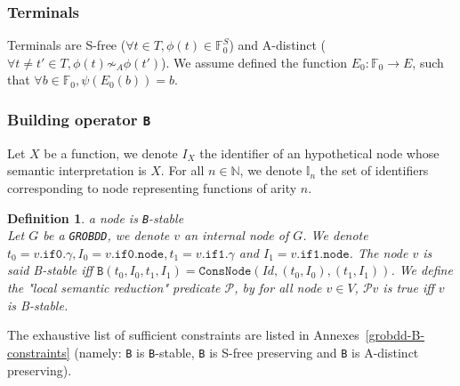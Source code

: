 \documentclass[a4paper,10pt]{article}
\newcommand{\N}{\mathbb{N}}%
\newcommand{\F}{\mathbb{F}}
\newcommand{\I}{\mathbb{I}}
\newcommand{\GroBdd}{\texttt{GROBDD}}
\newcommand{\fieldNode}{\texttt{node}}
\newcommand{\fieldGamma}{\mathtt{\gamma}}
\newcommand{\fieldThen}{\mathtt{if1}}
\newcommand{\fieldElse}{\mathtt{if0}}
\newtheorem{newdef}{Definition}
\newcommand{\definition}[2]{\begin{newdef}{#1\\}#2\end{newdef}}
\begin{document}
\subsubsection{Terminals}
Terminals are S-free ($\forall t\in T, \phi(t)\in\F^S_0$) and A-distinct ($\forall t\neq t'\in T, \phi(t) \not\sim_A \phi(t')$).
We assume defined the function $E_0: \F_0 \longrightarrow E$, such that $\forall b\in\F_0, \psi(E_0(b)) = b$. 


\subsubsection{Building operator \texttt{B}}

Let $X$ be a function, we denote $I_X$ the identifier of an hypothetical node whose semantic interpretation is $X$.
For all $n\in\N$, we denote $\I_n$ the set of identifiers corresponding to node representing functions of arity $n$.

\definition{a node is \texttt{B}-stable}
{
Let $G$ be a \GroBdd{}, we denote $v$ an internal node of $G$.
We denote $t_0 = v.\fieldElse{}.\fieldGamma{}, I_0 = v.\fieldElse{}.\fieldNode{}, t_1 = v.\fieldThen{}.\fieldGamma{}$ and $I_1 = v.\fieldThen{}.\fieldNode{}$.
The node $v$ is said B-stable iff $\mathtt{B}(t_0, I_0, t_1, I_1) = \mathtt{ConsNode}(Id, (t_0, I_0), (t_1, I_1))$.
We define the "local semantic reduction" predicate $\mathcal{P}$, by for all node $v\in V$, $\mathcal{P} v$ is true iff $v$ is B-stable.
}

The exhaustive list of sufficient constraints are listed in Annexes~\ref{grobdd-B-constraints} (namely: \texttt{B} is \texttt{B}-stable, \texttt{B} is S-free preserving and \texttt{B} is A-distinct preserving).
\end{document}
